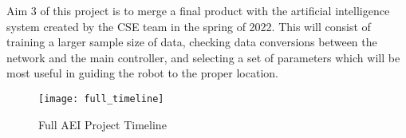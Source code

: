 		Aim 3 of this project is to merge a final product with the artificial intelligence system created by the CSE team in the spring of 2022. This will consist of training a larger sample size of data, checking data conversions between the network and the main controller, and selecting a set of parameters which will be most useful in guiding the robot to the proper location.

	\begin{figure}[ht]
		\centering
		\texttt{[image: full\_timeline]}
		\caption{Full AEI Project Timeline}
		\label{fig:full_timeline}
	\end{figure}
